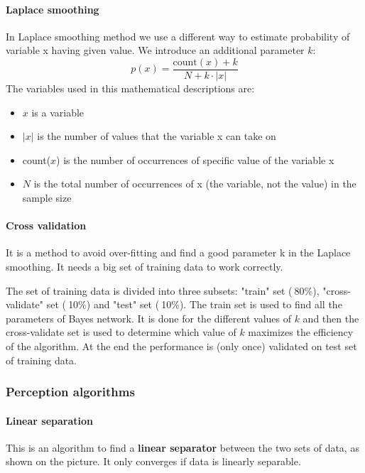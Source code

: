 \documentclass[a4paper,10pt]{article}
\begin{document}
\paragraph*{Laplace smoothing}

In Laplace smoothing method we use a different way to estimate probability of variable x having given value. We introduce an additional parameter $k$:
\[ p(x) = \frac{\mathrm{count}(x)+k}{N+k\cdot |x|} \]
The variables used in this mathematical descriptions are:
\begin{itemize}
\setlength{\itemsep}{0pt}
\setlength{\parskip}{0pt}
\setlength{\parsep}{0pt}
\item $x$ is a variable
\item $|x|$ is the number of values that the variable x can take on
\item count($x$) is the number of occurrences of specific value of the variable x
\item $N$ is the total number of occurrences of x (the variable, not the value) in the sample size
\end{itemize}

\paragraph*{Cross validation}

It is a method to avoid over-fitting and find a good parameter k in the Laplace smoothing. It needs a big set of training data to work correctly.

The set of training data is divided into three subsets: "train" set ($~$80\%), "cross-validate" set ($~$10\%) and "test" set ($~$10\%). The train set is used to find all the parameters of Bayes network. It is done for the different values of $k$ and then the cross-validate set is used to determine which value of $k$ maximizes the efficiency of the algorithm. At the end the performance is (only once) validated on test set of training data.

\subsubsection{Perception algorithms}
\paragraph{Linear separation}

This is an algorithm to find a \textbf{linear separator} between the two sets of data, as shown on the picture. It only converges if data is linearly separable.
\end{document}
